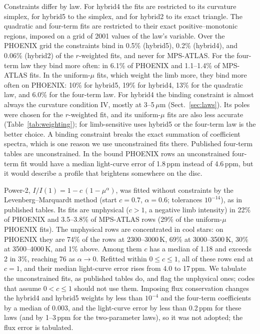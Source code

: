 \documentclass{aa}
\newcommand{\ppm}{\,\textrm{ppm}}
\begin{document}
Constraints differ by law. For hybrid4 the fits are restricted to its
curvature simplex, for hybrid5 to the simplex, and for hybrid2 to its exact
triangle. The quadratic and
four-term fits are restricted to their exact positive--monotonic regions,
imposed on a grid of 2001 values of the law's variable. Over the PHOENIX grid
the constraints bind in 0.5\% (hybrid5), 0.2\% (hybrid4), and 0.06\%
(hybrid2) of the $r$-weighted fits, and never for MPS-ATLAS. For the four-term
law they bind more often: in 6.1\% of PHOENIX and 1.1--1.4\% of MPS-ATLAS fits.
In the uniform-$\mu$ fits, which weight the limb more, they bind more often on
PHOENIX: 10\% for hybrid5, 19\% for hybrid4, 13\% for the quadratic law, and
6.0\% for the four-term law. For hybrid4 the binding constraint is almost
always the curvature condition IV, mostly at 3--5\,$\mu$m
(Sect.~\ref{sec:laws}). Its poles were chosen for the $r$-weighted fit, and
its uniform-$\mu$ fits are also less accurate (Table~\ref{tab:weighting}); for
limb-sensitive uses hybrid5 or the four-term law is the better choice. A binding constraint breaks the exact summation of
coefficient spectra, which is one reason we use unconstrained fits there.
Published four-term tables are unconstrained. In the bound PHOENIX rows an
unconstrained four-term fit would have a median light-curve error of 1.8\ppm{}
instead of 4.6\ppm, but it would describe a profile that brightens somewhere
on the disc.

Power-2, $I/I(1)=1-c\,(1-\mu^\alpha)$, was fitted without constraints by the
Levenberg--Marquardt method
(start $c=0.7$, $\alpha=0.6$; tolerances $10^{-14}$), as in published tables.
Its fits are unphysical ($c>1$, a negative limb intensity) in 22\% of PHOENIX
and 3.5--3.8\% of MPS-ATLAS rows (29\% of the uniform-$\mu$ PHOENIX fits). The
unphysical rows are concentrated in cool stars: on PHOENIX they are 74\% of
the rows at 2300--3000\,K, 69\% at 3000--3500\,K, 30\% at 3500--4000\,K, and
1\% above. Among them $c$ has a median of 1.18 and exceeds 2 in 3\%, reaching
76 as $\alpha\to0$. Refitted within $0\le c\le1$, all of these rows end at
$c=1$, and their median light-curve error rises from 4.0 to 17\ppm. We
tabulate the unconstrained fits, as published tables do, and flag the
unphysical ones; codes that assume $0<c\le1$ should not use them. Imposing flux
conservation \citep{claretbloemen2011} changes the hybrid4 and hybrid5 weights
by less than $10^{-4}$ and the four-term coefficients by a median of 0.003,
and the light-curve error by less than 0.2\ppm{} for these laws (and by 1--3\ppm{}
for the two-parameter laws), so it was not adopted; the flux error is
tabulated.
\end{document}
